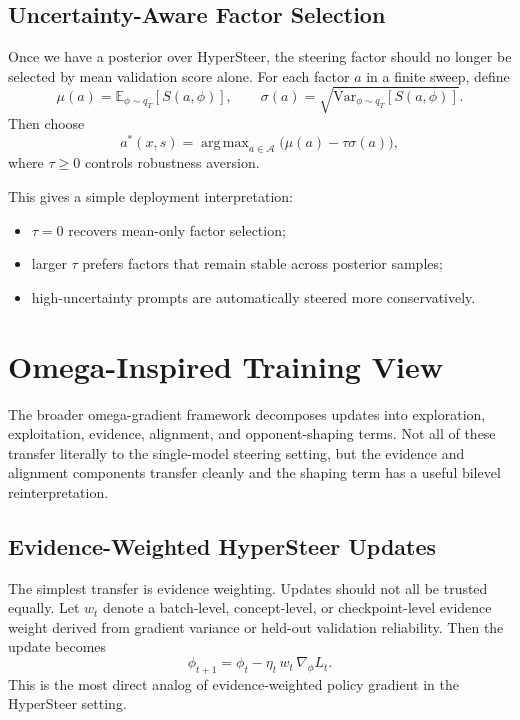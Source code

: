 \documentclass[10pt]{article}
\newcommand{\E}{\mathbb{E}}
\newcommand{\Var}{\mathrm{Var}}
\newcommand{\argmax}{\mathop{\mathrm{arg\,max}}}
\begin{document}
\subsection{Uncertainty-Aware Factor Selection}

Once we have a posterior over HyperSteer, the steering factor should no longer be selected by mean validation score alone. For each factor $a$ in a finite sweep, define
\begin{equation}
\mu(a) = \E_{\phi \sim q_T}[S(a,\phi)],
\qquad
\sigma(a) = \sqrt{\Var_{\phi \sim q_T}[S(a,\phi)]}.
\end{equation}
Then choose
\begin{equation}
a^*(x,s)
=
\argmax_{a \in \mathcal{A}}
\bigl(\mu(a) - \tau \sigma(a)\bigr),
\end{equation}
where $\tau \ge 0$ controls robustness aversion.

This gives a simple deployment interpretation:
\begin{itemize}[leftmargin=1.5em]
  \item $\tau=0$ recovers mean-only factor selection;
  \item larger $\tau$ prefers factors that remain stable across posterior samples;
  \item high-uncertainty prompts are automatically steered more conservatively.
\end{itemize}

\section{Omega-Inspired Training View}

The broader omega-gradient framework decomposes updates into exploration, exploitation, evidence, alignment, and opponent-shaping terms. Not all of these transfer literally to the single-model steering setting, but the evidence and alignment components transfer cleanly and the shaping term has a useful bilevel reinterpretation.

\subsection{Evidence-Weighted HyperSteer Updates}

The simplest transfer is evidence weighting. Updates should not all be trusted equally. Let $w_t$ denote a batch-level, concept-level, or checkpoint-level evidence weight derived from gradient variance or held-out validation reliability. Then the update becomes
\begin{equation}
\phi_{t+1}
=
\phi_t
-
\eta_t \, w_t \, \nabla_\phi L_t.
\end{equation}
This is the most direct analog of evidence-weighted policy gradient in the HyperSteer setting.
\end{document}
